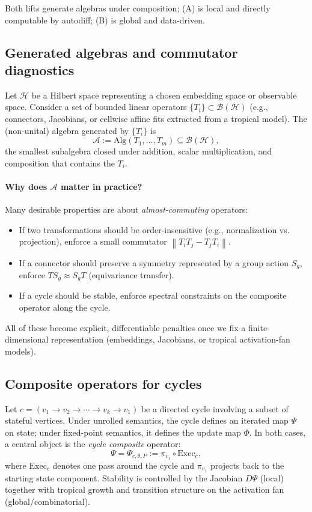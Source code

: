 \documentclass[11pt]{article}
\theoremstyle{definition}
\theoremstyle{plain}
\theoremstyle{remark}
\newcommand{\norm}[1]{\left\lVert #1 \right\rVert}
\newcommand{\mc}[1]{\mathcal{#1}}
\begin{document}
Both lifts generate algebras under composition; (A) is local and directly computable by autodiff; (B) is global and data-driven.

\subsection{Generated algebras and commutator diagnostics}
Let $\mc{H}$ be a Hilbert space representing a chosen embedding space or observable space.
Consider a set of bounded linear operators $\{T_i\}\subset \mc{B}(\mc{H})$ (e.g., connectors, Jacobians, or cellwise affine fits extracted from a tropical model).
The (non-unital) algebra generated by $\{T_i\}$ is
\[
\mc{A}:=\mathrm{Alg}(T_1,\dots,T_m)\subseteq \mc{B}(\mc{H}),
\]
the smallest subalgebra closed under addition, scalar multiplication, and composition that contains the $T_i$.

\paragraph{Why does $\mc{A}$ matter in practice?}
Many desirable properties are about \emph{almost-commuting} operators:
\begin{itemize}[leftmargin=2em]
\item If two transformations should be order-insensitive (e.g., normalization vs. projection), enforce a small commutator $\norm{T_iT_j-T_jT_i}$.
\item If a connector should preserve a symmetry represented by a group action $S_g$, enforce $T S_g\approx S_g T$ (equivariance transfer).
\item If a cycle should be stable, enforce spectral constraints on the composite operator along the cycle.
\end{itemize}
All of these become explicit, differentiable penalties once we fix a finite-dimensional representation (embeddings, Jacobians, or tropical activation-fan models).

\subsection{Composite operators for cycles}
Let $c=(v_1\to v_2\to \cdots \to v_k \to v_1)$ be a directed cycle involving a subset of stateful vertices.
Under unrolled semantics, the cycle defines an iterated map $\Psi$ on state; under fixed-point semantics, it defines the update map $\Phi$.
In both cases, a central object is the \emph{cycle composite} operator:
\[
\Psi = \Psi_{c,\theta,P} := \pi_{v_1}\circ \mathrm{Exec}_c,
\]
where $\mathrm{Exec}_c$ denotes one pass around the cycle and $\pi_{v_1}$ projects back to the starting state component.
Stability is controlled by the Jacobian $D\Psi$ (local) together with tropical growth and transition structure on the activation fan (global/combinatorial).
\end{document}
